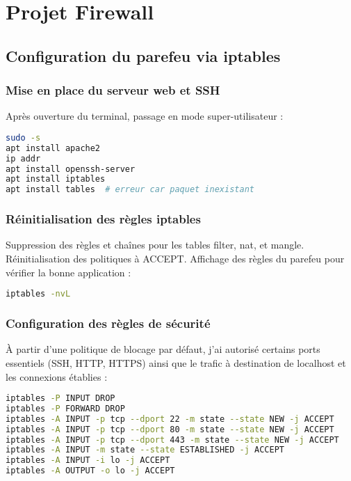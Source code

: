 \documentclass[12pt,a4paper]{article}
\begin{document}
\section{Projet Firewall}
\subsection{Configuration du parefeu via iptables}

\subsubsection{Mise en place du serveur web et SSH}

Apr\`es ouverture du terminal, passage en mode super-utilisateur :

\begin{lstlisting}[language=bash]
sudo -s
apt install apache2
ip addr
apt install openssh-server
apt install iptables
apt install tables  # erreur car paquet inexistant
\end{lstlisting}

\subsubsection{R\'einitialisation des r\`egles iptables}

Suppression des r\`egles et cha\^ines pour les tables filter, nat, et mangle. R\'einitialisation des politiques \`a ACCEPT. Affichage des règles du parefeu pour vérifier la bonne application :

\begin{lstlisting}[language=bash]
iptables -nvL
\end{lstlisting}

\subsubsection{Configuration des r\`egles de s\'ecurit\'e}

\`A partir d'une politique de blocage par d\'efaut, j'ai autoris\'e certains ports essentiels (SSH, HTTP, HTTPS) ainsi que le trafic \`a destination de localhost et les connexions \'etablies :

\begin{lstlisting}[language=bash]
iptables -P INPUT DROP
iptables -P FORWARD DROP
iptables -A INPUT -p tcp --dport 22 -m state --state NEW -j ACCEPT
iptables -A INPUT -p tcp --dport 80 -m state --state NEW -j ACCEPT
iptables -A INPUT -p tcp --dport 443 -m state --state NEW -j ACCEPT
iptables -A INPUT -m state --state ESTABLISHED -j ACCEPT
iptables -A INPUT -i lo -j ACCEPT
iptables -A OUTPUT -o lo -j ACCEPT
\end{lstlisting}
\end{document}

